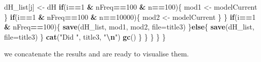 \documentclass[
]{article}
\newenvironment{Shaded}{\begin{snugshade}}{\end{snugshade}}
\newcommand{\AttributeTok}[1]{\textcolor[rgb]{0.13,0.29,0.53}{#1}}
\newcommand{\ControlFlowTok}[1]{\textcolor[rgb]{0.13,0.29,0.53}{\textbf{#1}}}
\newcommand{\DecValTok}[1]{\textcolor[rgb]{0.00,0.00,0.81}{#1}}
\newcommand{\FunctionTok}[1]{\textcolor[rgb]{0.13,0.29,0.53}{\textbf{#1}}}
\newcommand{\NormalTok}[1]{#1}
\newcommand{\OtherTok}[1]{\textcolor[rgb]{0.56,0.35,0.01}{#1}}
\newcommand{\SpecialCharTok}[1]{\textcolor[rgb]{0.81,0.36,0.00}{\textbf{#1}}}
\newcommand{\StringTok}[1]{\textcolor[rgb]{0.31,0.60,0.02}{#1}}
\begin{document}
\begin{Shaded}
\begin{Highlighting}[]
\NormalTok{            dH\_list[j]  }\OtherTok{\textless{}{-}}\NormalTok{ dH}
            \ControlFlowTok{if}\NormalTok{(i}\SpecialCharTok{==}\DecValTok{1} \SpecialCharTok{\&}\NormalTok{ nFreq}\SpecialCharTok{==}\DecValTok{100} \SpecialCharTok{\&}\NormalTok{ n}\SpecialCharTok{==}\DecValTok{100}\NormalTok{)\{}
\NormalTok{              mod1 }\OtherTok{\textless{}{-}}\NormalTok{ modelCurrent}
\NormalTok{            \}}
            \ControlFlowTok{if}\NormalTok{(i}\SpecialCharTok{==}\DecValTok{1} \SpecialCharTok{\&}\NormalTok{ nFreq}\SpecialCharTok{==}\DecValTok{100} \SpecialCharTok{\&}\NormalTok{ n}\SpecialCharTok{==}\DecValTok{10000}\NormalTok{)\{}
\NormalTok{              mod2 }\OtherTok{\textless{}{-}}\NormalTok{ modelCurrent}
\NormalTok{            \}}
\NormalTok{          \}}
          \ControlFlowTok{if}\NormalTok{(i}\SpecialCharTok{==}\DecValTok{1} \SpecialCharTok{\&}\NormalTok{ nFreq}\SpecialCharTok{==}\DecValTok{100}\NormalTok{)\{}
            \FunctionTok{save}\NormalTok{(dH\_list, mod1, mod2, }\AttributeTok{file=}\NormalTok{title3)}
\NormalTok{          \}}\ControlFlowTok{else}\NormalTok{\{}
            \FunctionTok{save}\NormalTok{(dH\_list, }\AttributeTok{file=}\NormalTok{title3)}
\NormalTok{          \}}
          \FunctionTok{cat}\NormalTok{(}\StringTok{"Did "}\NormalTok{, title3, }\StringTok{"}\SpecialCharTok{\textbackslash{}n}\StringTok{"}\NormalTok{)}
          \FunctionTok{gc}\NormalTok{()}
\NormalTok{        \}}
\NormalTok{      \}}
\NormalTok{    \}}
\NormalTok{  \}}
\NormalTok{\}}
\end{Highlighting}
\end{Shaded}

we concatenate the results and are ready to visualise them.
\end{document}
